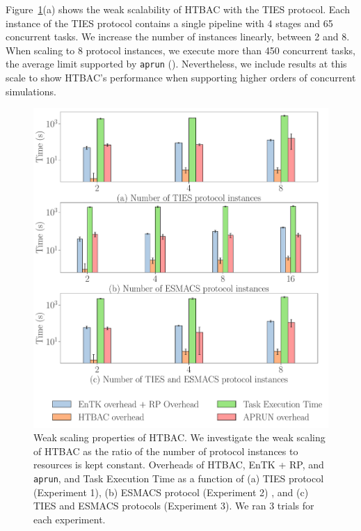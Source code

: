 Figure~\ref{fig:ws}(a) shows the weak scalability of HTBAC with the TIES
protocol. Each instance of the TIES protocol
contains a single pipeline with 4 stages and 65 concurrent tasks. We increase
the number of instances linearly, between 2 and 8. When scaling to 8 protocol
instances, we execute more than 450 concurrent tasks, the average limit
supported by \texttt{aprun} (). Nevertheless, we include results at this
scale to show HTBAC's performance when supporting higher orders of concurrent
simulations.

\begin{figure}
  \centering
    \includegraphics[width=\columnwidth]{figures/ws_all.pdf}
    \caption{Weak scaling properties of HTBAC. We investigate the weak
    scaling of HTBAC as the ratio of the number of protocol instances to
    resources is kept constant. Overheads of HTBAC, EnTK + RP, and
    \texttt{aprun}, and Task Execution Time as a function of (a) TIES
    protocol (Experiment 1), (b) ESMACS protocol (Experiment 2) , and (c)
    TIES and ESMACS protocols (Experiment 3). We ran 3 trials for each
    experiment.}
\label{fig:ws}
\end{figure}

